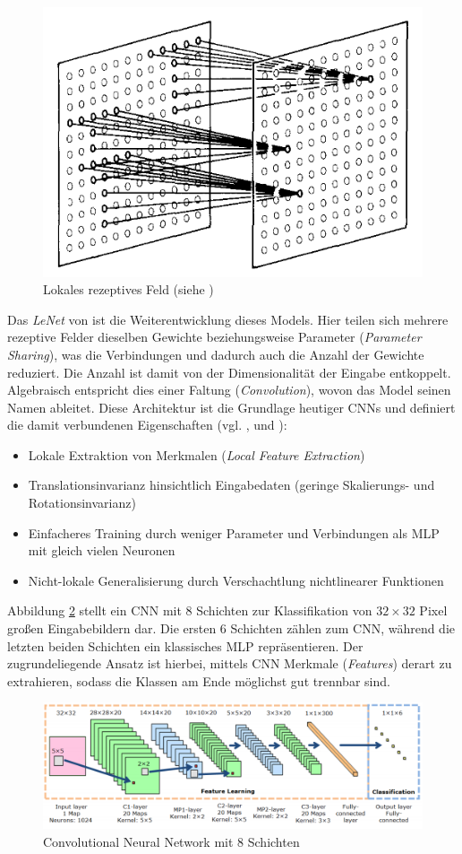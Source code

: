  \begin{figure}[H]
 \centering
 \includegraphics[width=0.3\linewidth]{images/3_receptive_field}
 \caption[Lokales rezeptives Feld]{Lokales rezeptives Feld (siehe \cite{Fukushima1980})}
 \label{fig:3_receptive_field}
 \end{figure}

Das \textit{LeNet} von \cite{LeCun1989} ist die Weiterentwicklung dieses Models. Hier teilen sich mehrere rezeptive Felder dieselben Gewichte beziehungsweise Parameter (\textit{Parameter Sharing}), was die Verbindungen und dadurch auch die Anzahl der Gewichte reduziert. Die Anzahl ist damit von der Dimensionalität der Eingabe entkoppelt. Algebraisch entspricht dies einer Faltung (\textit{Convolution}), wovon das Model seinen Namen ableitet. Diese Architektur ist die Grundlage heutiger CNNs und definiert die damit verbundenen Eigenschaften (vgl. \cite{LeCun1998}, \cite{Bengio2007b} und \cite{Zeiler2014}):
\begin{itemize}
\item Lokale Extraktion von Merkmalen (\textit{Local Feature Extraction})
\item Translationsinvarianz hinsichtlich Eingabedaten (geringe Skalierungs- und Rotationsinvarianz)
\item Einfacheres Training durch weniger Parameter und Verbindungen als MLP mit gleich vielen Neuronen
\item Nicht-lokale Generalisierung durch Verschachtlung nichtlinearer Funktionen
\end{itemize}

Abbildung \ref{fig:3_cnn} stellt ein CNN mit 8 Schichten zur Klassifikation von $32 \times 32$ Pixel großen Eingabebildern dar. Die ersten 6 Schichten zählen zum CNN, während die letzten beiden Schichten ein klassisches MLP repräsentieren. Der zugrundeliegende Ansatz ist hierbei, mittels CNN Merkmale (\textit{Features}) derart zu extrahieren, sodass die Klassen am Ende möglichst gut trennbar sind. 

\begin{figure}[H]
\centering
\includegraphics[width=0.95\linewidth]{images/3_CNN_Architecture}
\caption[Convolutional Neural Network mit 8 Schichten]{Convolutional Neural Network mit 8 Schichten \cite[siehe][]{Nagi2011}}
\label{fig:3_cnn}
\end{figure}

